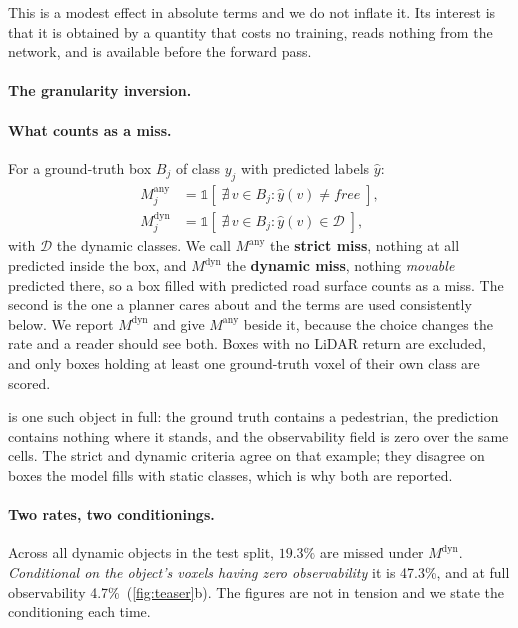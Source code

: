 \documentclass[10pt,twocolumn,letterpaper]{article}
\newcommand{\missHi}{47.3\%}
\newcommand{\missLo}{4.7\%}
\begin{document}
This is a modest effect in absolute terms and we do not inflate it. Its
interest is that it is obtained by a quantity that costs no training, reads
nothing from the network, and is available before the forward pass.

\paragraph{The granularity inversion.}
\label{sec:inversion}
\paragraph{What counts as a miss.} For a ground-truth box $B_j$ of class
$y_j$ with predicted labels $\hat{y}$:
\begin{align}
M_j^{\text{any}} &= \mathbb{1}\!\left[\;\nexists\, v \in B_j :
   \hat{y}(v) \neq \textit{free}\;\right], \label{eq:missany}\\
M_j^{\text{dyn}} &= \mathbb{1}\!\left[\;\nexists\, v \in B_j :
   \hat{y}(v) \in \mathcal{D}\;\right], \label{eq:missdyn}
\end{align}
with $\mathcal{D}$ the dynamic classes. We call $M^{\text{any}}$ the \textbf{strict miss}, nothing at all
predicted inside the box, and $M^{\text{dyn}}$ the \textbf{dynamic miss},
nothing \emph{movable} predicted there, so a box filled with predicted road
surface counts as a miss. The second is the one a planner cares about and
the terms are used consistently below. We report
$M^{\text{dyn}}$ and give $M^{\text{any}}$ beside it, because the choice
changes the rate and a reader should see both. Boxes with no LiDAR return
are excluded, and only boxes holding at least one ground-truth voxel of
their own class are scored.

 is one such object in full: the ground truth
contains a pedestrian, the prediction contains nothing where it stands,
and the observability field is zero over the same cells. The strict and
dynamic criteria agree on that example; they disagree on boxes the model
fills with static classes, which is why both are reported.

\paragraph{Two rates, two conditionings.} Across all dynamic objects in the
test split, $19.3\%$ are missed under $M^{\text{dyn}}$. \emph{Conditional on
the object's voxels having zero observability} it is \missHi, and at full
observability \missLo\ (\cref{fig:teaser}b). The figures are not in tension
and we state the conditioning each time.
\end{document}

